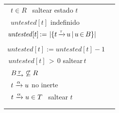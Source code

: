 \begin{algorithm}[tb]
\begin{algorithmic}[1]
\begin{tabular}{@{}>{\raggedright\arraybackslash}p{6.9cm}||>{\raggedright\arraybackslash}p{5.3cm}@{}}
		\STATE	\hspace*{3\algorithmicindent}\algorithmicif\ $t\in R$ \algorithmicthen\ saltear estado $t$\label{alg:line-skip-R-states}   & \\
		\STATE	\hspace*{3\algorithmicindent}\algorithmicif\ $\mathit{untested}[t]$ indefinido \algorithmicthen                           & \\
		\STATE	\hspace*{4\algorithmicindent}$\mathit{untested}[t]\,{:=}\,\size{\{ t\,{\pijl{\tau}}\,u\,{\mid}\,u\,{\in}\,B \}}$          & \\ \label{alg:line-define-untested}
		\STATE	\hspace*{3\algorithmicindent}\algorithmicendif                                                                            & \\
		\STATE	\hspace*{3\algorithmicindent}$\mathit{untested}[t] := \mathit{untested}[t] - 1$                                           & \\
		\STATE	\hspace*{3\algorithmicindent}\algorithmicif\,$\mathit{untested}[t]\,{>}\,0$\,\algorithmicthen\,saltear\,$t$               & \\
		\STATE	\hspace*{3\algorithmicindent}\algorithmicif\ $\BT\not \subseteq R$\ \algorithmicthen \label{alg:slow-test}       & \rightbrace{5}{\parbox[l]{0.3\textwidth}{%
																			$\bigO(\size{U_{\pijl{}}} + \mbox{}$ \\
																			$\phantom{\bigO (}\lvert(\Bottom(R) \setminus \mbox{}$ \\
																			$\phantom{\bigO (\lvert(}\Bottom(B))_{\pijl{}}\rvert)$}}\\
		\STATE	\hspace*{4\algorithmicindent}\algorithmicforall\ $t \pijl{\alpha} u$ no inerte \algorithmicdo                            & \\
		\STATE	\hspace*{5\algorithmicindent}\algorithmicif\ $t \pijl{\alpha} u \in T$  \algorithmicthen\ saltear $t$                     & \\
		\STATE	\hspace*{4\algorithmicindent}\algorithmicendfor                                                                           & \\
		\STATE	\hspace*{3\algorithmicindent}\algorithmicendif \label{alg:slow-test-end}                                                  & \\

\end{tabular}
\end{algorithmic}
\end{algorithm}
